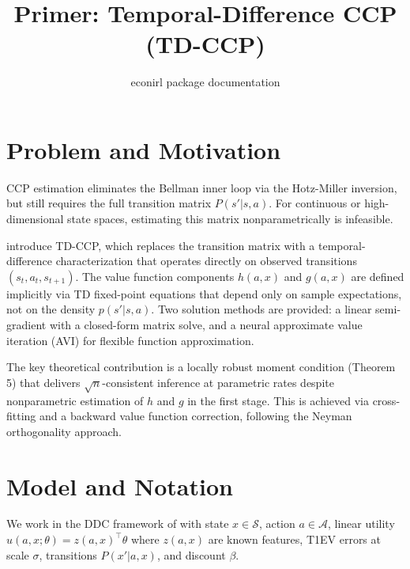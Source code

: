 \documentclass[10pt]{article}
\title{Primer: Temporal-Difference CCP (TD-CCP)}
\author{econirl package documentation}
\date{}
\newcommand{\calA}{\mathcal{A}}
\newcommand{\calS}{\mathcal{S}}
\begin{document}
\maketitle


\section{Problem and Motivation}

CCP estimation \citep{hotzMiller1993, aguirregabiriaMira2002} eliminates the Bellman inner loop via the Hotz-Miller inversion, but still requires the full transition matrix $P(s'|s,a)$. For continuous or high-dimensional state spaces, estimating this matrix nonparametrically is infeasible.

\citet{adusumilliEckardt2025} introduce TD-CCP, which replaces the transition matrix with a temporal-difference characterization that operates directly on observed transitions $(s_t, a_t, s_{t+1})$. The value function components $h(a,x)$ and $g(a,x)$ are defined implicitly via TD fixed-point equations that depend only on sample expectations, not on the density $p(s'|s,a)$. Two solution methods are provided: a linear semi-gradient with a closed-form matrix solve, and a neural approximate value iteration (AVI) for flexible function approximation.

The key theoretical contribution is a locally robust moment condition (Theorem 5) that delivers $\sqrt{n}$-consistent inference at parametric rates despite nonparametric estimation of $h$ and $g$ in the first stage. This is achieved via cross-fitting and a backward value function correction, following the Neyman orthogonality approach.


\section{Model and Notation}

We work in the DDC framework of \citet{rust1987} with state $x \in \calS$, action $a \in \calA$, linear utility $u(a,x;\theta) = z(a,x)^\top\theta$ where $z(a,x)$ are known features, T1EV errors at scale $\sigma$, transitions $P(x'|a,x)$, and discount $\beta$.
\end{document}
